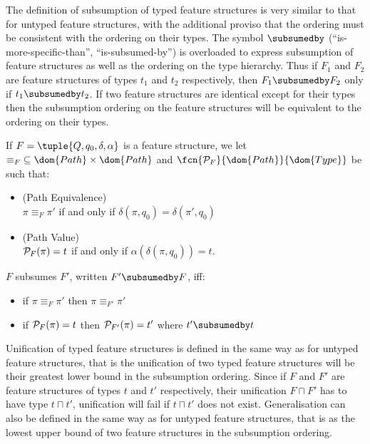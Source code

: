 \documentclass[12pt]{report}
\begin{document}
The definition of subsumption of typed feature structures 
is very similar to that for untyped feature structures, with the
additional proviso that the ordering
must be consistent with
the ordering on their types.  The symbol
$\subsumedby$
(``is-more-specific-than'', ``is-subsumed-by'')
is overloaded
to express subsumption of feature structures as well as the ordering
on the type hierarchy.
Thus
if $F_{1}$ and $F_{2}$ are feature structures of types $t_{1}$ and $t_{2}$
respectively, then $F_{1} \subsumedby F_{2}$ only if $t_{1} 
\subsumedby t_{2}$.   
If two feature structures are identical except
for their types then the subsumption ordering on the feature
structures will be equivalent to the ordering on their types.
\begin{definition}
If $F = \tuple{Q,q_{0},\delta,\alpha}$ is a feature structure, we let
$\equiv_{F} \; \subseteq \dom{Path} \times \dom{Path}$ and
$\fcn{{\cal P}_{F}}{\dom{Path}}{\dom{Type}}$ be such that:
\begin{itemize}
\item
(Path Equivalence) \\
$\pi \equiv_{F} \pi'$ 
if and only if $\delta(\pi,q_{0}) = \delta(\pi',q_{0})$
\item
(Path Value) \\
${\cal P}_{F}(\pi) = t$ 
if and only if
$\alpha(\delta(\pi,q_{0})) = t$.
\end{itemize}
\end{definition}
%
\begin{definition}
$F$ subsumes $F'$, written $F' \subsumedby F$, iff:
\begin{itemize}
\item if $\pi \equiv_{F} \pi'$ then $\pi \equiv_{F'} \pi'$
\item if ${\cal P}_{F}(\pi) = t$ then ${\cal P}_{F'}(\pi) = t'$ where $t' \subsumedby t$
\end{itemize}
\end{definition}
%

Unification of typed feature structures is defined 
in the same way as for untyped feature structures, that is
the unification of two typed feature structures
will be their greatest lower bound in the subsumption ordering.
Since if $F$ and $F'$ are feature structures of types $t$ and $t'$
respectively, their unification $F \sqcap F'$ has to have
type $t \sqcap t'$, unification will fail if
$t \sqcap t'$ does not exist.  
Generalisation can also be defined in the same way
as for untyped feature structures, that is as the lowest upper bound
of two 
feature
structures in the subsumption ordering.
\end{document}
